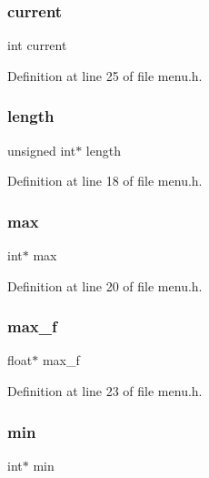 \subsubsection{\texorpdfstring{current}{current}}
{\footnotesize\ttfamily int current}



Definition at line 25 of file menu.\+h.

\mbox{\label{structmenu_ad42d625fa749b07c73c9ae28ea4c3bd2}} 
\subsubsection{\texorpdfstring{length}{length}}
{\footnotesize\ttfamily unsigned int$\ast$ length}



Definition at line 18 of file menu.\+h.

\mbox{\label{structmenu_a0cfebdbd2ba1d9ae782a6cd77f734e9e}} 
\subsubsection{\texorpdfstring{max}{max}}
{\footnotesize\ttfamily int$\ast$ max}



Definition at line 20 of file menu.\+h.

\mbox{\label{structmenu_a70e64637ad619d8d1f0bca19af45f169}} 
\subsubsection{\texorpdfstring{max\+\_\+f}{max\_f}}
{\footnotesize\ttfamily float$\ast$ max\+\_\+f}



Definition at line 23 of file menu.\+h.

\mbox{\label{structmenu_aea9f5a2490568cd16f46c29df1106fc1}} 
\subsubsection{\texorpdfstring{min}{min}}
{\footnotesize\ttfamily int$\ast$ min}



